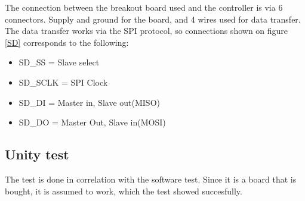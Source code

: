The connection between the breakout board used and the controller is via 6 connectors. Supply and ground for the board, and 4 wires used for data transfer. The data transfer works via the SPI protocol, so connections shown on figure \vref{SD} corresponds to the following:

\begin{itemize}
	\item{SD\_SS = Slave select}
	\item{SD\_SCLK = SPI Clock}
	\item{SD\_DI = Master in, Slave out(MISO)}
	\item{SD\_DO = Master Out, Slave in(MOSI)}
\end{itemize}

\subsection{Unity test}
The test is done in correlation with the software test. Since it is a board that is bought, it is assumed to work, which the test showed succesfully. 